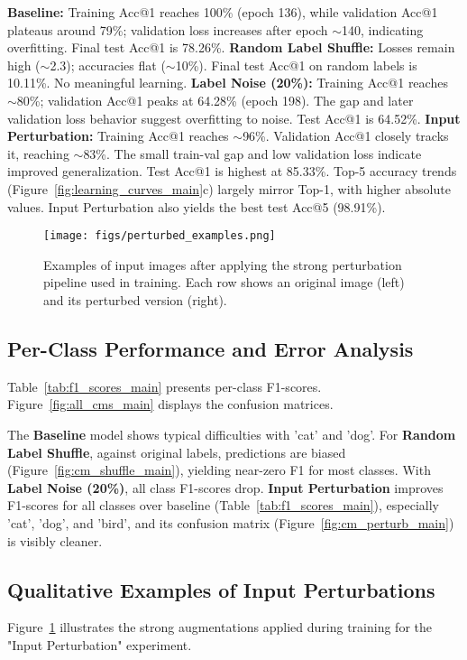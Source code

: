 \documentclass[10pt,twocolumn,letterpaper]{article}
\begin{document}
\textbf{Baseline:} Training Acc@1 reaches 100\% (epoch 136), while validation Acc@1 plateaus around 79\%; validation loss increases after epoch $\sim$140, indicating overfitting. Final test Acc@1 is 78.26\%.
\textbf{Random Label Shuffle:} Losses remain high ($\sim$2.3); accuracies flat ($\sim$10\%). Final test Acc@1 on random labels is 10.11\%. No meaningful learning.
\textbf{Label Noise (20\%):} Training Acc@1 reaches $\sim$80\%; validation Acc@1 peaks at 64.28\% (epoch 198). The gap and later validation loss behavior suggest overfitting to noise. Test Acc@1 is 64.52\%.
\textbf{Input Perturbation:} Training Acc@1 reaches $\sim$96\%. Validation Acc@1 closely tracks it, reaching $\sim$83\%. The small train-val gap and low validation loss indicate improved generalization. Test Acc@1 is highest at 85.33\%.
Top-5 accuracy trends (Figure~\ref{fig:learning_curves_main}c) largely mirror Top-1, with higher absolute values. Input Perturbation also yields the best test Acc@5 (98.91\%).

\begin{figure}[htbp!] %
    \centering
    \texttt{[image: figs/perturbed\_examples.png]}
    \caption{Examples of input images after applying the strong perturbation pipeline used in training. Each row shows an original image (left) and its perturbed version (right).}
    \label{fig:perturbed_examples_main}
\end{figure}

\subsection{Per-Class Performance and Error Analysis}
\label{ssec:per_class_main}
Table~\ref{tab:f1_scores_main} presents per-class F1-scores. Figure~\ref{fig:all_cms_main} displays the confusion matrices.

The \textbf{Baseline} model shows typical difficulties with 'cat' and 'dog'. For \textbf{Random Label Shuffle}, against original labels, predictions are biased (Figure~\ref{fig:cm_shuffle_main}), yielding near-zero F1 for most classes. With \textbf{Label Noise (20\%)}, all class F1-scores drop. \textbf{Input Perturbation} improves F1-scores for all classes over baseline (Table~\ref{tab:f1_scores_main}), especially 'cat', 'dog', and 'bird', and its confusion matrix (Figure~\ref{fig:cm_perturb_main}) is visibly cleaner.

\subsection{Qualitative Examples of Input Perturbations}
\label{ssec:qualitative_main}
Figure~\ref{fig:perturbed_examples_main} illustrates the strong augmentations applied during training for the "Input Perturbation" experiment.
\end{document}
